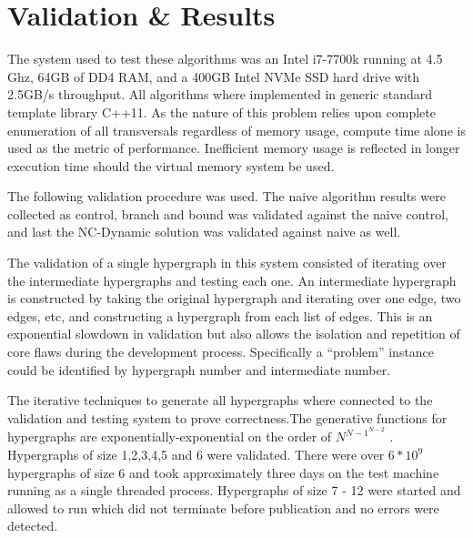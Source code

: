 
















\chapter{Validation \& Results}


The system used to test these algorithms was an Intel i7-7700k running at 4.5 Ghz, 64GB of DD4 RAM, and a 400GB Intel NVMe SSD hard drive with 2.5GB/s throughput. All algorithms where implemented in generic standard template library C++11. As the nature of this problem relies upon complete enumeration of all transversals regardless of memory usage, compute time alone is used as the metric of performance.  Inefficient memory usage is reflected in longer execution time should the virtual memory system be used.

The following validation procedure was used. The naive algorithm results were collected as control, branch and bound was validated against the naive control, and last the NC-Dynamic solution was validated against naive as well. 

The validation of a single hypergraph in this system consisted of iterating over the intermediate hypergraphs and testing each one. An intermediate hypergraph is constructed by taking the original hypergraph and iterating over one edge, two edges, etc, and constructing a hypergraph from each list of edges. This is an exponential slowdown in validation but also allows the isolation and repetition of core flaws during the development process. Specifically a ``problem'' instance could be identified by hypergraph number and intermediate number.

The iterative techniques to generate all hypergraphs where connected to the validation and testing system to prove correctness.The generative functions for hypergraphs are exponentially-exponential on the order of $N^{{N-1}^{{N-2}^{...}}}$.
Hypergraphs of size 1,2,3,4,5 and 6 were validated. There were over $6*10^9$ hypergraphs of size 6 and took approximately three days on the test machine running as a single threaded process.  Hypergraphs of size 7 - 12 were started and allowed to run which did not terminate before publication and no errors were detected.



